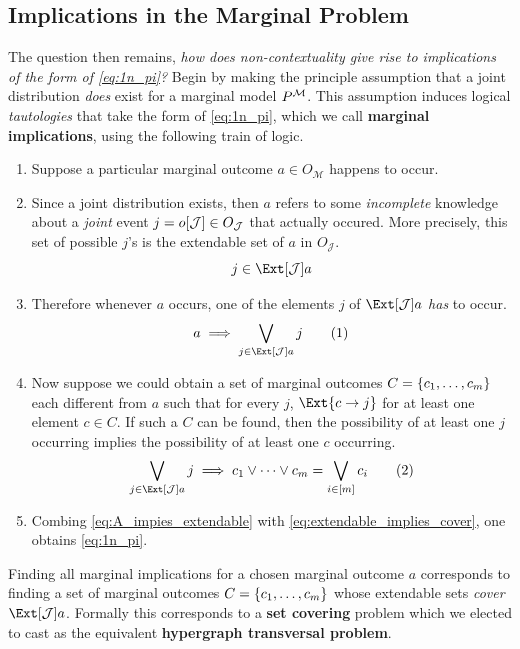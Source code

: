 \documentclass[aps, 10pt, english, twoside, pra, nofootinbib, longbibliography]{revtex4-1}
\theoremstyle{plain}
\theoremstyle{definition}
\theoremstyle{remark}
\newcommand{\mscenario}{\mathcal{M}}
\newcommand{\jointvar}{\mathcal{J}}
\newcommand{\term}[1]{\textcolor{Mahogany}{\textbf{#1}}}
\newcommand{\outc}[1]{o\bs{#1}} %
\begin{document}
    \subsection{Implications in the Marginal Problem}
    \label{sec:implications_marginal_problem}
    The question then remains, \textit{how does non-contextuality give rise to implications of the form of \cref{eq:1n_pi}?} Begin by making the principle assumption that a joint distribution \textit{does} exist for a marginal model $\prob^{\mscenario}$. This assumption induces logical \textit{tautologies} that take the form of \cref{eq:1n_pi}, which we call \term{marginal implications}, using the following train of logic.
    \begin{enumerate}
        \item Suppose a particular marginal outcome $a \in O_{\mscenario}$ happens to occur.
        \item Since a joint distribution exists, then $a$ refers to some \textit{incomplete} knowledge about a \textit{joint} event $j = \outc{\jointvar} \in O_{\jointvar}$ that actually occured. More precisely, this set of possible $j$'s is the extendable set of $a$ in $O_{\jointvar}$.
        \[ j \in \Ext[\jointvar]{a} \]
        \item Therefore whenever $a$ occurs, one of the elements $j$ of $\Ext[\jointvar]{a}$ \textit{has} to occur.
        \[ a \implies \bigvee_{j \in \Ext[\jointvar]{a}} j \eq \label{eq:A_impies_extendable}\]
        \item Now suppose we could obtain a set of marginal outcomes $C = \bc{c_1, \ldots, c_m}$ each different from $a$ such that for every $j$, $\Ext{c \to j}$ for at least one element $c \in C$. If such a $C$ can be found, then the possibility of at least one $j$ occurring implies the possibility of at least one $c$ occurring.
        \[ \bigvee_{j \in \Ext[\jointvar]{a}} j \implies c_1 \vee \cdots \vee c_m = \bigvee_{i \in \bs{m}} c_i\eq \label{eq:extendable_implies_cover} \]

        \item Combing \cref{eq:A_impies_extendable} with \cref{eq:extendable_implies_cover}, one obtains \cref{eq:1n_pi}.
    \end{enumerate}


    Finding all marginal implications for a chosen marginal outcome $a$ corresponds to finding a set of marginal outcomes $C = \bc{c_1, \ldots, c_m}$ whose extendable sets \textit{cover} $\Ext[\jointvar]{a}$. Formally this corresponds to a \term{set covering} problem  which we elected to cast as the equivalent \term{hypergraph transversal problem}.
\end{document}
